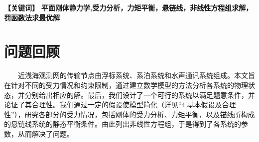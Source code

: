 \documentclass[a4paper,12pt]{ctexart}
\begin{document}
\noindent \textbf{【关键词】}
\textbf{平面刚体静力学,受力分析，力矩平衡，悬链线，非线性方程组求解，罚函数法求最优解}

\newpage


\section{问题回顾}

~~~~近浅海观测网的传输节点由浮标系统、系泊系统和水声通讯系统组成。本文旨在针对不同的受力情况和约束限制，通过建立数学模型的方法分析各系统的物理状态，并分别给出相应的解。最后，我们设计了一个可行的系统以满足题意条件，并论证了其合理性。我们通过一定的假设使模型简化（详见“4.基本假设及合理性”），研究各部分的受力情况，包括刚体的受力分析、力矩平衡，以及锚线所构成的悬链线系统的静态平衡条件。由此列出非线性方程组，于是得到了各系统的参数，从而解决了问题。
\end{document}
